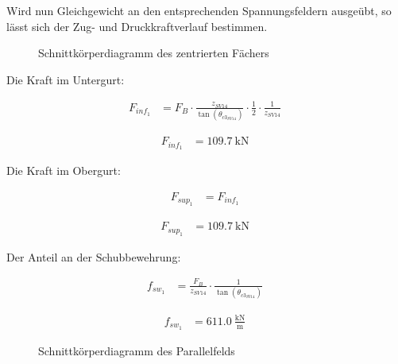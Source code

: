 \documentclass[
  11pt,
  letterpaper,
]{scrreprt}
\begin{document}
Wird nun Gleichgewicht an den entsprechenden Spannungsfeldern ausgeübt,
so lässt sich der Zug- und Druckkraftverlauf bestimmen.

\begin{figure}[H]


\caption{\label{fig-skd_1_spannungsfelder_sv14}Schnittkörperdiagramm des
zentrierten Fächers}

\end{figure}%

Die Kraft im Untergurt:

$$
\begin{aligned}
F_{inf_{1}} &= F_{B} \cdot \frac{ z_{SV14} }{ \tan \left( \theta_{c3_{SV14}} \right) } \cdot \frac{1} { 2 } \cdot \frac{1} { z_{SV14} } \; 
\end{aligned}
$$

$$
\begin{aligned}
F_{inf_{1}} &= 109.7\ \mathrm{kN} \; 
\end{aligned}
$$

Die Kraft im Obergurt:

$$
\begin{aligned}
F_{sup_{1}} &= F_{inf_{1}} \; 
\end{aligned}
$$

$$
\begin{aligned}
F_{sup_{1}} &= 109.7\ \mathrm{kN} \; 
\end{aligned}
$$

Der Anteil an der Schubbewehrung:

$$
\begin{aligned}
f_{sw_{1}} &= \frac{ F_{B} }{ z_{SV14} } \cdot \frac{1} { \tan \left( \theta_{c3_{SV14}} \right) } \; 
\end{aligned}
$$

$$
\begin{aligned}
f_{sw_{1}} &= 611.0\ \frac{\mathrm{kN}}{\mathrm{m}} \;
\end{aligned}
$$

\begin{figure}[H]


\caption{\label{fig-skd_2_spannungsfelder_sv14}Schnittkörperdiagramm des
Parallelfelds}

\end{figure}%
\end{document}
